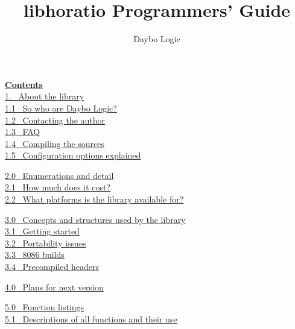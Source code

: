 \documentclass{article}
\begin{document}
\title{libhoratio Programmers' Guide}\author{Daybo Logic}
\maketitle

\par\vspace*{\fill}
\begin{center}

\end{center}

\newpage
\par \textbf{\underline{Contents}}
\\
\href{#About}{1.~ About the library}
\\
\href{#Who}{1.1~ So who are Daybo Logic?}
\\
\href{#Contact}{1.2~ Contacting the author}
\\
\href{#FAQ}{1.3~ FAQ}
\\
\href{#Compile}{1.4~ Compiling the sources}
\\
\href{#Config}{1.5~ Configuration options explained}

\par \href{#Enumerations}{2.0~ Enumerations and detail}\\
\href{#Cost}{2.1~ How much does it cost?}
\\
\href{#Platforms}{2.2~ What platforms is the library available
for?}

\par \href{#Concepts}{3.0~ Concepts and structures used by the
library}
\\
\href{#Starting}{3.1~ Getting started}
\\
\href{#Portability}{3.2~ Portability issues}
\\
\href{#8086}{3.3~ 8086 builds}
\\
\href{#PCH}{3.4~ Precompiled headers}

\href{#Plans}{4.0~ Plans for next version}

\par \href{#Listings}{5.0~ Function listings}\\
\href{#FuncDescs}{5.1~ Descriptions of all functions and their use}
\end{document}

